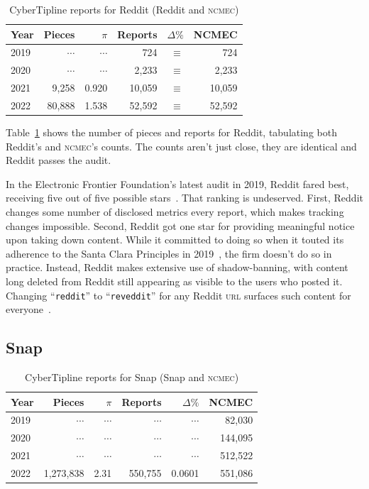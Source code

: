 \documentclass[nonacm,screen]{acmart}
\newcommand\V[1]{\textsc{\MakeLowercase{#1}}}
\begin{document}
\begin{table}[h!]
\centering\libertineLF
\caption{CyberTipline reports for Reddit (Reddit and \V{NCMEC})}
\label{tab:reddit}
\begin{tabular}{l|rr|rrr}
\textbf{Year}
& \textbf{Pieces} & \textbf{$\pi$} & \textbf{Reports}
& \textbf{$\Delta\%$} & \textbf{NCMEC} \\ \hline
2019 & $\cdots$ & $\cdots$ & 724 & $\equiv$ & 724 \\
2020 & $\cdots$ & $\cdots$ & 2,233 & $\equiv$ & 2,233 \\
2021 & 9,258 & 0.920 & 10,059 & $\equiv$ & 10,059 \\
2022 & 80,888 & 1.538 & 52,592 & $\equiv$ & 52,592 \\
\end{tabular}
\end{table}

\noindent{}Table~\ref{tab:reddit} shows the number of pieces and reports for
Reddit, tabulating both Reddit's and \V{NCMEC}'s counts. The counts aren't just
close, they are identical and Reddit passes the audit.

In the Electronic Frontier Foundation's latest audit in 2019, Reddit fared best,
receiving five out of five possible stars~\cite{CrockerGebhartea2019}. That
ranking is undeserved. First, Reddit changes some number of disclosed metrics
every report, which makes tracking changes impossible. Second, Reddit got one
star for providing meaningful notice upon taking down content. While it
committed to doing so when it touted its adherence to the Santa Clara Principles
in 2019~\cite{Reddit2022}, the firm doesn't do so in practice. Instead, Reddit
makes extensive use of shadow-banning, with content long deleted from Reddit
still appearing as visible to the users who posted it. Changing
``\texttt{reddit}'' to ``\texttt{reveddit}'' for any Reddit \V{URL} surfaces
such content for everyone~\cite{Hawkins2023}.


\subsection{Snap}

\begin{table}[h!]
\centering\libertineLF
\caption{CyberTipline reports for Snap (Snap and \V{NCMEC})}
\label{tab:snap}
\begin{tabular}{l|rr|rrr}
\textbf{Year}
& \textbf{Pieces} & \textbf{$\pi$} & \textbf{Reports}
& \textbf{$\Delta\%$} & \textbf{NCMEC} \\ \hline
2019 & $\cdots$ & $\cdots$ & $\cdots$ & $\cdots$ & 82,030 \\
2020 & $\cdots$ & $\cdots$ & $\cdots$ & $\cdots$ & 144,095 \\
2021 & $\cdots$ & $\cdots$ & $\cdots$ & $\cdots$ & 512,522 \\
2022 & 1,273,838 & 2.31 & 550,755 & 0.0601 & 551,086 \\
\end{tabular}
\end{table}
\end{document}
